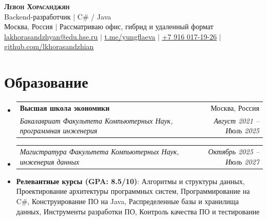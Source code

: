\documentclass[letterpaper,11pt]{article}
\makeatletter
\newcommand{\resumeItem}[1]{
  \item\small{
    {#1 \vspace{-4pt}}
  }
}
\newcommand{\resumeSubheading}[4]{
  \vspace{-2pt}\item
    \begin{tabular*}{0.97\textwidth}[t]{l@{\extracolsep{\fill}}r}
      \textbf{#1} & #2 \\
      \textit{\small#3} & \textit{\small #4} \\
    \end{tabular*}\vspace{-7pt}
}
\newcommand{\resumeSubSubheading}[2]{
    \item
    \begin{tabular*}{0.97\textwidth}{l@{\extracolsep{\fill}}r}
      \textit{\small#1} & \textit{\small #2} \\
    \end{tabular*}\vspace{-7pt}
}
\newcommand{\resumeSubHeadingListStart}{\begin{itemize}[leftmargin=0.15in, label={}]}
\newcommand{\resumeSubHeadingListEnd}{\end{itemize}}
\makeatother
\begin{document}
\begin{center}
    \textbf{\Huge \scshape Левон Хорасанджян} \\ \vspace{2pt}
    \small Backend-разработчик $|$ C\# / Java \\ \vspace{1pt}
    \small Москва, Россия $|$ Рассматриваю офис, гибрид и удаленный формат \\ \vspace{1pt}
    \href{mailto:lakhorasandzhyan@edu.hse.ru}{\underline{lakhorasandzhyan@edu.hse.ru}} $|$ 
    \href{https://t.me/yungflaeva}{\underline{t.me/yungflaeva}} $|$
    \href{tel:+79160171926}{\underline{+7 916 017-19-26}} $|$
    \href{https://github.com/lkhorasandzhian}{\underline{github.com/lkhorasandzhian}}
\end{center}

\section{Образование}
  \resumeSubHeadingListStart
    \resumeSubheading
      {Высшая школа экономики}{Москва, Россия}
      {Бакалавриат Факультета Компьютерных Наук, программная инженерия}{Август 2021 -- Июль 2025}
    \resumeSubSubheading
      {Магистратура Факультета Компьютерных Наук, инженерия данных}{Октябрь 2025 -- Июль 2027}
    \resumeItem{
        \textbf{Релевантные курсы (GPA: 8.5/10)}: Алгоритмы и структуры данных, Проектирование архитектуры программных систем, Программирование на C\#, Конструирование ПО на Java, Распределенные базы и хранилища данных, Инструменты разработки ПО, Контроль качества ПО и тестирование
    }

  \resumeSubHeadingListEnd

\end{document}
